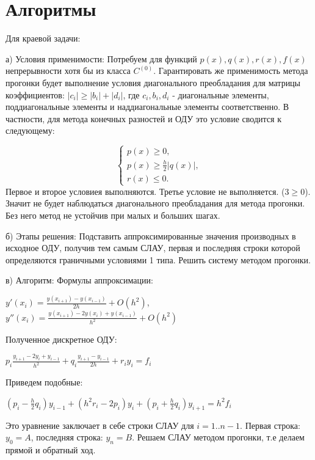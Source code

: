 \documentclass{article}
\begin{document}
	\section{Алгоритмы}
	Для краевой задачи:
	
	а) Условия применимости: Потребуем для функций $p(x), q(x),r(x), f(x)$ непрерывности хотя бы из класса $C^{(0)}$. Гарантировать же применимость метода прогонки будет выполнение условия диагонального преобладания для матрицы коэффициентов: $|c_i| \geq |b_i| + |d_i|$, где $c_i, b_i, d_i$ - диагональные элементы, поддиагональные элементы и наддиагональные элементы соответственно. В частности, для метода конечных разностей и  ОДУ это условие сводится к следующему: 
	
	\begin{equation*}
		\begin{cases}
			p(x) \geq 0, 
			\\
			p(x) \geq \frac{h}{2}|q(x)|,
			\\
			r(x) \leq 0.
		\end{cases}
	\end{equation*}
	Первое и второе условиея выполняются. Третье условие не выполняется. ($3 \geq 0$). Значит не будет наблюдаться диагонального преобладания для метода прогонки. Без него метод не устойчив при малых и больших шагах.
	
	б) Этапы решения: Подставить аппроксимированные значения производных в исходное ОДУ, получив тем самым СЛАУ, первая и последняя строки которой определяются граничными условиями 1 типа. Решить систему методом прогонки. \par
	
	в) Алгоритм: Формулы аппроксимации:
	\begin{center}
		$y'(x_i) = \frac{y(x_{i+1}) - y(x_{i-1})}{2h} + O(h^2)$, $y''(x_i) = \frac{y(x_{i+1}) - 2y(x_i) + y(x_{i-1})}{h^2} + O(h^2)$ \\
	\end{center}
	\hspace{7mm} Полученное дискретное ОДУ:
	\begin{center}
		$p_i\frac{y_{i+1} - 2y_i + y_{i-1}}{h^2} + q_i\frac{y_{i+1} - y_{i-1}}{2h} + r_iy_i = f_i$ \\
	\end{center}
	\hspace{7mm} Приведем подобные:
	\begin{center}
		$(p_i - \frac{h}{2}q_i)y_{i-1} + (h^2r_i-2p_i)y_i + (p_i + \frac{h}{2}q_i)y_{i+1} = h^2f_i$ \\
	\end{center}
	\hspace{7mm} Это уравнение заключает в себе строки СЛАУ для $i = 1..n-1$. Первая строка: $y_0 = A$, последняя строка: $y_n = B$. Решаем СЛАУ методом прогонки, т.е делаем прямой и обратный ход.\par
	
\end{document}
